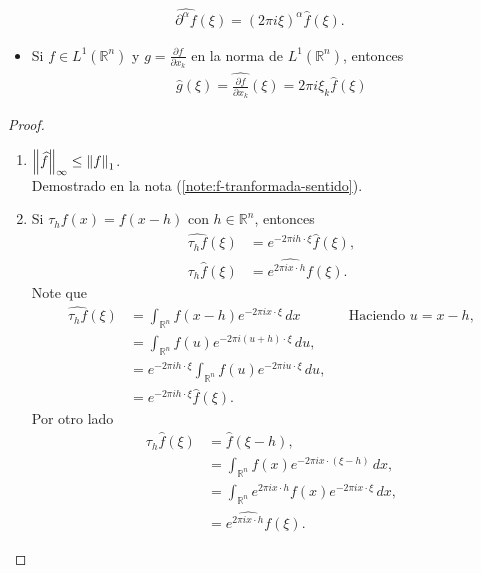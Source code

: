 \begin{theorem}{}
\begin{enumerate}
\begin{align*}
          \hat{\partial^{\alpha}f}(\xi)=(2\pi i\xi)^{\alpha}\hat{f}(\xi).
        \end{align*}
        \begin{itemize}
          \item Si $f\in L^{1}(\mathbb{R}^{n})$ y $g=\frac{\partial f}{\partial x_k}$ en la norma de $L^1(\mathbb{R}^{n})$, entonces
            \begin{align*}
              \hat{g}(\xi)=\hat{\frac{\partial f}{\partial x_k}}(\xi)=2\pi i\xi_{k}\hat{f}(\xi)
            \end{align*}
        \end{itemize}
    \end{enumerate}
  \end{theorem}
  \begin{proof} 
    \begin{enumerate}
      \item $\left\lVert\widehat{f}\right\rVert_{\infty}\leq\left\lVert f\right\rVert_{1}$.\\
        Demostrado en la nota (\ref{note:f-tranformada-sentido}).
      \item Si $\tau_{h}f(x)=f(x-h)$ con $h\in\mathbb{R}^{n}$, entonces
        \begin{align*}
          \hat{\tau_{h}f}(\xi)&=e^{-2\pi ih\cdot \xi}\hat{f}(\xi),\\
          \tau_{h}\hat{f}(\xi)&=\hat{e^{2\pi ix\cdot h}f}(\xi).
        \end{align*}
        Note que
        \begin{align*}
          \hat{\tau_{h}f}(\xi)&=\int_{\mathbb{R}^{n}}f(x-h)e^{-2\pi ix\cdot\xi}\,dx &&\text{Haciendo $u=x-h$},\\
          &=\int_{\mathbb{R}^{n}}f(u)e^{-2\pi i (u+h)\cdot\xi}\,du,\\
          &=e^{-2\pi ih\cdot\xi}\int_{\mathbb{R}^{n}}f(u)e^{-2\pi i u\cdot\xi}\,du,\\
          &=e^{-2\pi ih\cdot\xi} \hat{f}(\xi).
        \end{align*}
        Por otro lado
        \begin{align*}
          \tau_{h}\hat{f}(\xi)&=\hat{f}(\xi-h),\\
          &=\int_{\mathbb{R}^{n}}f(x)e^{-2\pi ix\cdot (\xi-h)}\,dx,\\
          &=\int_{\mathbb{R}^{n}}e^{2\pi ix\cdot h}f(x)e^{-2\pi ix\cdot \xi}\,dx,\\
          &=\hat{e^{2\pi ix\cdot h}f}(\xi).
        \end{align*}

\end{enumerate}
\end{proof}
